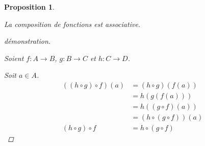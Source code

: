 \documentclass{report}
\newtheorem*{prop}{Proposition}
\theoremstyle{definition}
\theoremstyle{remark}
\begin{document}
	\begin{prop}
		~

		La composition de fonctions est associative.
		\begin{proof}[d\'emonstration]~

			Soient $f:A \to B$, $g:B \to C$ et $h:C \to D$.

			Soit $a \in A$.
			\begin{align*}
				((h \circ g) \circ f)(a)&= (h \circ g)(f(a))\\
				&= h(g(f(a)))\\
				&= h((g \circ f)(a))\\
				&= (h \circ (g \circ f))(a)\\
				(h \circ g) \circ f&= h \circ (g \circ f)
			\end{align*}
		\end{proof}
	\end{prop}
	\setcounter{chapter}{5}
\end{document}
